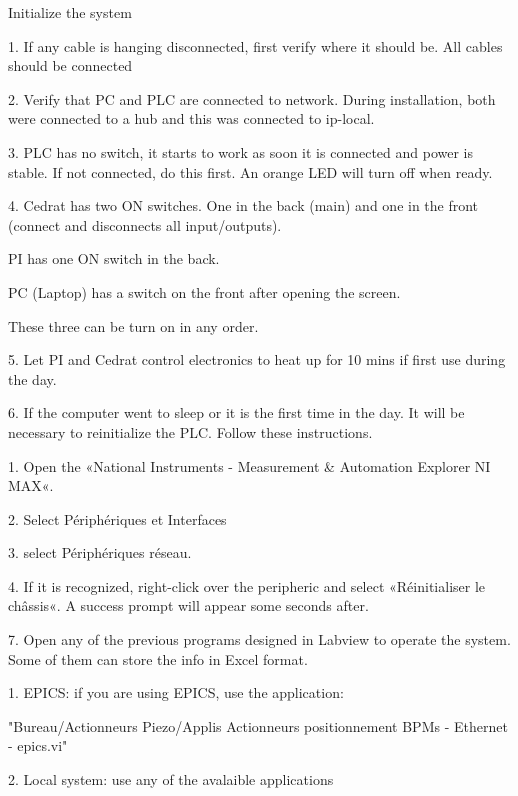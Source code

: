 \documentclass[a4paper,11pt]{book}
\begin{document}
Initialize the system\par
1. If any cable is hanging disconnected, first verify where it should be. All cables should be connected\par
2. Verify that PC and PLC are connected to network. During installation, both were connected to a hub and this was connected to ip-local.\par
3. PLC has no switch, it starts to work as soon it is connected and power is stable. If not connected, do this first. An orange LED will turn off when ready.\par
4. Cedrat has two ON switches. One in the back (main) and one in the front (connect and disconnects all input/outputs).\par
PI has one ON switch in the back.\par
PC (Laptop) has a switch on the front after opening the screen.\par
These three can be turn on in any order.\par
5. Let PI and Cedrat control electronics to heat up for 10 mins if first use during the day.\par
6. If the computer went to sleep or it is the first time in the day. It will be necessary to reinitialize the PLC. Follow these instructions.\par
1. Open the «National Instruments - Measurement \& Automation Explorer NI MAX«.\par
2. Select Périphériques et Interfaces\par
3. select Périphériques réseau.\par
4. If it is recognized, right-click over the peripheric and select «Réinitialiser le châssis«. A success prompt will appear some seconds after.\par
7. Open any of the previous programs designed in Labview to operate the system. Some of them can store the info in Excel format.\par
1. EPICS: if you are using EPICS, use the application:\par
"Bureau/Actionneurs Piezo/Applis Actionneurs positionnement BPMs - Ethernet - epics.vi" \par
2. Local system: use any of the avalaible applications\par
\end{document}
